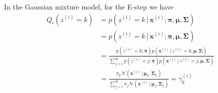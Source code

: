 \documentclass[final,3p,times,twocolumn]{elsarticle}
\begin{document}
In the Gaussian mixture model, for the E-step we have
\begin{equation}
\label{eqn:gmmE}
\begin{split}
Q_i(z^{(i)} = k) &= p(z^{(i)} = k\,|\,\boldsymbol x^{(i)}; \boldsymbol \pi, \boldsymbol \mu, \boldsymbol \Sigma)\\
&= p(z^{(i)}=k\,|\,\boldsymbol x^{(i)}; \boldsymbol \pi, \boldsymbol \mu, \boldsymbol \Sigma)\\
&= \frac{p(z^{(i)}=k;\boldsymbol \pi)p(\boldsymbol x^{(i)}\,|\,z^{(i)}=k;\boldsymbol \mu, \boldsymbol \Sigma)}
{\sum_{j=1}^K p(z^{(i)}=j;\boldsymbol \pi)p(\boldsymbol x^{(i)}\,|\,z^{(i)}=j;\boldsymbol \mu, \boldsymbol \Sigma)}\\
&= \frac{\pi_k\mathcal{N}(\boldsymbol x^{(i)}\,|\,\boldsymbol \mu_k, \boldsymbol \Sigma_k)}
{\sum_{j=1}^K \pi_j\mathcal{N}(\boldsymbol x^{(i)}\,|\,\boldsymbol \mu_j, \boldsymbol \Sigma_j)} = \gamma_k^{(i)}
\end{split}
\end{equation}
\end{document}
